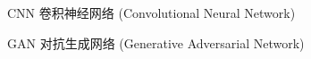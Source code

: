 \begin{denotation}[3cm]
\item[CNN] 卷积神经网络 (Convolutional Neural Network)
\item[GAN] 对抗生成网络 (Generative Adversarial Network)
\end{denotation}
